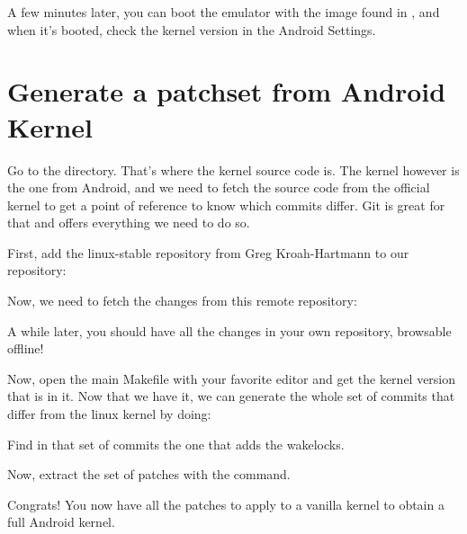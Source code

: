 A few minutes later, you can boot the emulator with the image found in
, and when it's booted, check the kernel version in the
Android Settings.

\section{Generate a patchset from Android Kernel}

Go to the  directory. That's where the kernel source code is. The
kernel however is the one from Android, and we need to fetch the source code
from the official kernel to get a point of reference to know which commits
differ. Git is great for that and offers everything we need to do so.

First, add the linux-stable repository from Greg Kroah-Hartmann to our
repository:


Now, we need to fetch the changes from this remote repository:


A while later, you should have all the changes in your own repository, browsable
offline!

Now, open the main Makefile with your favorite editor and get the kernel version
that is in it. Now that we have it, we can generate the whole set of commits that
differ from the linux kernel by doing:


Find in that set of commits the one that adds the wakelocks.

Now, extract the set of patches with the  command.

Congrats! You now have all the patches to apply to a vanilla kernel to obtain a
full Android kernel.
